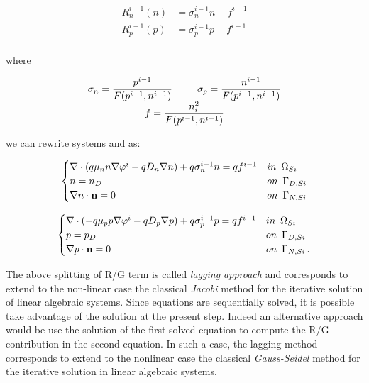 \begin{equation}
\label{eq: real Rn and Rp}
\begin{array}{rcl}
R_n^{i-1}(n) & = \sigma_n^{i-1} n - f^{i-1} \\
R_p^{i-1}(p) & = \sigma_p^{i-1} p - f^{i-1} \\
\end{array}
\end{equation}

where


\begin{equation}
\begin{array}{c}
\sigma_n  = \dfrac{p^{i-1}}{F(p^{i-1},n^{i-1})} \psp{15} \sigma_p   = \dfrac{n^{i-1}}{F(p^{i-1},n^{i-1})} \\
f  = \dfrac{n_i^2}{F(p^{i-1},n^{i-1})}
\end{array}
\end{equation}

we can rewrite systems  and  as:

\begin{equation}
\label{eq: LEC system new}
\begin{cases}
 \nabla \cdot ( q\mu_n n \nabla \varphi^i - qD_n \nabla n ) +q\sigma_n^{i-1} n = qf^{i-1} & in \psp{3} \Omega_{Si}
 \\
 n = n_D & on \psp{3} \Gamma_{D,Si}
 \\
 \nabla n \cdot \vect{n} = 0 & on \psp{3} \Gamma_{N,Si}
\end{cases}
\end{equation}

\begin{equation}
\label{eq: LHC system new}
\begin{cases}
\nabla \cdot (- q\mu_p p \nabla \varphi^i - qD_p \nabla p ) + q\sigma_p^{i-1} p =  qf^{i-1}& in \psp{3} \Omega_{Si}
\\
 p = p_D & on \psp{3} \Gamma_{D,Si}
 \\
 \nabla p \cdot \vect{n} = 0 & on \psp{3} \Gamma_{N,Si}\, .
\end{cases}
\end{equation}


The above splitting of R/G term is called \textit{lagging approach} \cite{Jerome:AnalyCharTran} and corresponds to extend to the non-linear case the classical \textit{Jacobi} method for the iterative  solution of linear algebraic systems. Since equations are sequentially solved, it is possible take advantage of the solution at the present step. Indeed an alternative approach would be use the solution of the first solved equation to compute the R/G contribution in the second equation. In such a case, the lagging method corresponds to extend to the nonlinear case the classical \textit{Gauss-Seidel} method for the iterative solution in linear algebraic systems.


